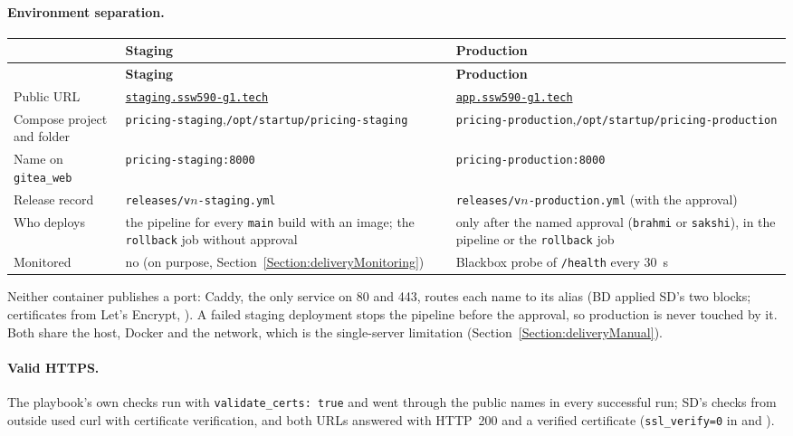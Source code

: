 \paragraph{Environment separation.}
\begin{tabularx}{\linewidth}{L{3.0cm}YY}
\caption{Staging and production on the same host\label{Table:DeliveryEnvs}}\\
\toprule & \textbf{Staging} & \textbf{Production}\\ \midrule
\endfirsthead
\toprule & \textbf{Staging} & \textbf{Production}\\ \midrule
\endhead \bottomrule \endlastfoot
Public URL & \href{https://staging.ssw590-g1.tech/health}{\texttt{staging.ssw590-g1.tech}} & \href{https://app.ssw590-g1.tech/health}{\texttt{app.ssw590-g1.tech}}\\
Compose project and folder & \texttt{pricing-staging},\newline \texttt{/opt/startup/}\newline\texttt{pricing-staging} & \texttt{pricing-production},\newline \texttt{/opt/startup/}\newline\texttt{pricing-production}\\
Name on \texttt{gitea\_web} & \texttt{pricing-staging:8000} & \texttt{pricing-production:8000}\\
Release record & \texttt{releases/v}$n$\texttt{-staging.yml} & \texttt{releases/v}$n$\texttt{-production.yml} (with the approval)\\
Who deploys & the pipeline for every \texttt{main} build with an image; the \texttt{rollback} job without approval & only after the named approval (\texttt{brahmi} or \texttt{sakshi}), in the pipeline or the \texttt{rollback} job\\
Monitored & no (on purpose, Section~\ref{Section:deliveryMonitoring}) & Blackbox probe of \texttt{/health} every 30~s\\
\end{tabularx}
Neither container publishes a port: Caddy, the only service on 80 and 443, routes each name to its alias (BD applied SD's two blocks; certificates from Let's Encrypt, ). A failed staging deployment stops the pipeline before the approval, so production is never touched by it.
Both share the host, Docker and the network, which is the single-server limitation (Section~\ref{Section:deliveryManual}).

\paragraph{Valid HTTPS.} The playbook's own checks run with \texttt{validate\_certs: true} and went through the public names in every successful run; SD's checks from outside used curl with certificate verification, and both URLs answered with HTTP~200 and a verified certificate
(\texttt{ssl\_verify=0} in  and ).

